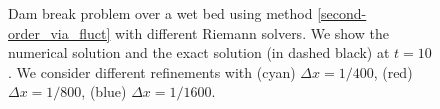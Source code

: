 \documentclass[preprint, 11pt]{article}
\begin{document}
\begin{figure}[!h]
  {\scriptsize
    \quad
    \quad
  }
  \caption{
    Dam break problem over a wet bed using method \eqref{second-order_via_fluct} with different
    Riemann solvers. We show the numerical solution and the exact solution (in dashed black) at $t=10$.
    We consider different refinements with
    (cyan) $\Delta x=1/400$, (red) $\Delta x=1/800$, (blue) $\Delta x=1/1600$.
    \label{fig:rp_wet_bed}}
\end{figure}
\end{document}

